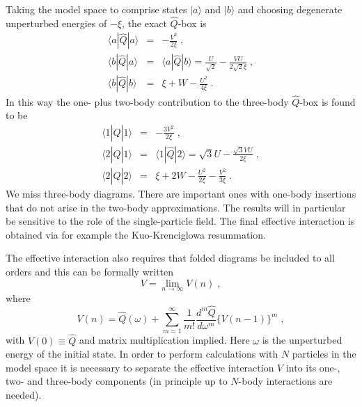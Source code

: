 Taking the model space to comprise states $|a\rangle$ and $|b\rangle$
and choosing degenerate unperturbed energies of $-\xi$, the exact
$\hat{Q}$-box is
\begin{eqnarray}
\langle a|\hat{Q}|a\rangle&=&-\frac{V^2}{2\xi}\;,\nonumber\\
\langle b|\hat{Q}|a\rangle&=&\langle a|\hat{Q}|b\rangle=\frac{U}{\sqrt{2}}
-\frac{VU}{2\sqrt{2}\xi}\;,\nonumber\\
\langle b|\hat{Q}|b\rangle&=&\xi+W-\frac{U^2}{4\xi}\nonumber\;.
\end{eqnarray}
In this way the one- plus 
two-body contribution to the three-body $\hat{Q}$-box is found to be
\begin{eqnarray}
\langle1|\hat{Q}|1\rangle&=&-\frac{3V^2}{2\xi}\;,\nonumber\\
\langle2|\hat{Q}|1\rangle&=&\langle1|\hat{Q}|2\rangle=\sqrt{3}U-
\frac{\sqrt{3}VU}{2\xi} \;,\nonumber\\
\langle2|\hat{Q}|2\rangle&=&\xi+2W-\frac{U^2}{2\xi}
-\frac{V^2}{3\xi}\;. \label{q2u}
\end{eqnarray}
We miss three-body diagrams.  There are important ones with one-body insertions that do not arise
in the two-body approximations. The results will in particular be sensitive to the 
role of the single-particle field.
The final effective interaction is obtained via for example the Kuo-Krenciglowa resummation.

The effective interaction also 
requires that folded diagrams be included to all orders and this can 
be formally written
\[
V=\lim_{n\rightarrow\infty}V(n)\;, \label{veff}  %
\]
where
\[
V(n)=\hat{Q}(\omega)+\sum_{m=1}^\infty\frac{1}{m!}\frac{d^m\hat{Q}}
{d\omega^m}\bigl\{V(n-1)\bigr\}^m\;, \label{veff2}  %
\]
with $V(0)\equiv\hat{Q}$ and matrix multiplication implied.
Here $\omega$ is the unperturbed energy of the initial state. In order
to perform calculations with $N$ particles in the model space it is
necessary to separate the effective interaction $V$ into its one-, two-
and three-body components (in principle up to $N$-body interactions are
needed).



